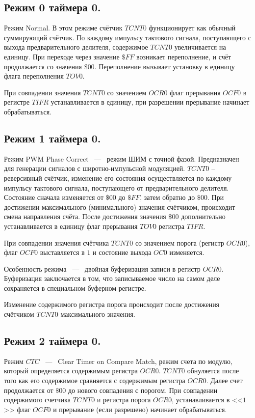 \subsection{Режим 0 таймера 0.}
Режим Normal. В этом режиме счётчик $TCNT0$ функционирует как обычный 
суммирующий счётчик. По каждому импульсу тактового сигнала, 
поступающего с выхода предварительного делителя, содержимое
$TCNT0$ увеличивается на единицу. 
При переходе через значение $\$FF$ возникает переполнение, и счёт продолжается
со значения $\$00$. Переполнение вызывает установку в единицу флага переполнения
$TOV0$.

При совпадении значения $TCNT0$ со значением
$OCR0$ флаг прерывания $OCF0$ в регистре $TIFR$ устанавливается в единицу, 
при разрешении прерывание начинает обрабатываться.


\subsection{Режим 1 таймера 0.}
Режим PWM Phase Correct ~---~ режим ШИМ с точной фазой.
Предназначен для генерации сигналов с широтно-импульсной модуляцией. 
$TCNT0$ -- реверсивный счётчик, изменение его состояния 
осуществляется по каждому импульсу тактового сигнала,
поступающего от предварительного делителя. 
Состояние сначала изменяется от $\$00$ до $\$FF$, затем
обратно до $\$00$. При достижении максимального (минимального) 
значения счётчиком, происходит смена направления счёта. 
После достижения значения $\$00$ дополнительно устанавливается 
в единицу флаг прерывания $TOV0$ регистра $TIFR$.

При совпадении значения счётчика $TCNT0$ со значением порога (регистр $OCR0$), 
флаг $OCF0$ выставляется в $1$ и состояние выхода $OC0$ изменяется.

Особенность режима ~---~ двойная буферизация записи в регистр $OCR0$. 
Буферизация заключается в том, что записываемое число на самом деле сохраняется в
специальном буферном регистре.

Изменение содержимого регистра порога происходит после достижения
счётчиком $TCNT0$ максимального значения.

\subsection{Режим 2 таймера 0.}
Режим $CTC$ ~---~ Clear Timer on Compare Match, режим счета по модулю, который определяется 
содержимым регистра $OCR0$. $TCNT0$ обнуляется после того как его содержимое сравняется с 
содержимым регистра $OCR0$. Далее счет продолжается от $\$00$ до нового совпадения с порогом. 
При совпадении содержимого счетчика $TCNT0$ и регистра порога $OCR0$, устанавливается в <<$1$>> 
флаг $OCF0$ и прерывание (если разрешено) начинает обрабатываться.

